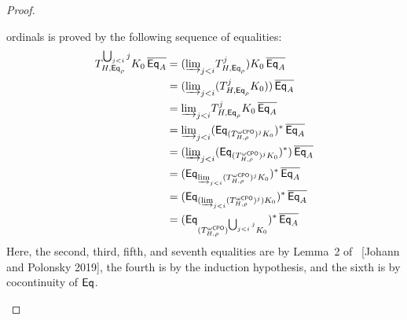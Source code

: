 \documentclass[acmsmall,review,anonymous]{acmart}
\theoremstyle{definition}
\begin{document}
\begin{proof}
\begin{itemize}
{  ordinals is proved by the following sequence of equalities:
\[
\begin{split}
T^{\bigcup_{j<i}j}_{H,\mathsf{Eq}_\rho} K_0\, \overline{\mathsf{Eq}_A}
&= ({{\underrightarrow{\lim}}_{j < i}{T^j_{H,\mathsf{Eq}_\rho}}}) K_0\, \overline{\mathsf{Eq}_A}\\
&= ({{\underrightarrow{\lim}}_{j < i}{(T^j_{H,\mathsf{Eq}_\rho} K_0)}})\, \overline{\mathsf{Eq}_A}\\
&= {{\underrightarrow{\lim}}_{j < i}{T^j_{H,\mathsf{Eq}_\rho} K_0\, \overline{\mathsf{Eq}_A}}}\\
&= {{\underrightarrow{\lim}}_{j < i}{(\mathsf{Eq}_{(T^{\omega\mathsf{CPO}}_{H,\rho})^j K_0})^*\,
  \overline{\mathsf{Eq}_A}}}\\
&= ({{\underrightarrow{\lim}}_{j < i}{(\mathsf{Eq}_{(T^{\omega\mathsf{CPO}}_{H,\rho})^j K_0})^*)\,
  \overline{\mathsf{Eq}_A}}}\\
&= (\mathsf{Eq}_{{{\underrightarrow{\lim}}_{j < i}{(T^{\omega\mathsf{CPO}}_{H,\rho})^j K_0}}})^*\,
\overline{\mathsf{Eq}_A}\\
&= (\mathsf{Eq}_{({{\underrightarrow{\lim}}_{j < i}{(T^{\omega\mathsf{CPO}}_{H,\rho})^j}}) K_0})^*\,
\overline{\mathsf{Eq}_A}\\
&= (\mathsf{Eq}_{(T^{\omega\mathsf{CPO}}_{H,\rho})^{\bigcup_{j < i}j} K_0})^*\, \overline{\mathsf{Eq}_A}\\
\end{split}
\]
Here, the second, third, fifth, and seventh equalities are by Lemma~2
of~{\color{red} [Johann and Polonsky 2019]}, the fourth is by the
induction hypothesis, and the sixth is by cocontinuity of $\mathsf{Eq}$.}

\vspace*{0.1in}


\end{itemize}
\end{proof}
\end{document}
